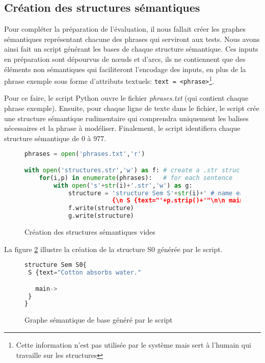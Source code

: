 \subsection{Création des structures sémantiques}\label{sec:pythonstruc}

Pour compléter la préparation de l'évaluation, il nous fallait créer les graphes sémantiques représentant chacune des phrases qui serviront aux tests. Nous avons ainsi fait un script générant les bases de chaque structure sémantique. Ces inputs en préparation sont dépourvus de n\oe{}uds et d'arcs, ils ne contiennent que des éléments non sémantiques qui faciliteront l'encodage des inputs, en plus de la phrase exemple sous forme d'attributs textuels: \texttt{text = <phrase>}\footnote{Cette information n'est pas utilisée par le système mais sert à l'humain qui travaille sur les structures}.

Pour ce faire, le script Python ouvre le fichier \emph{phrases.txt} (qui contient chaque phrase exemple). Ensuite, pour chaque ligne de texte dans le fichier, le script crée une structure sémantique rudimentaire qui comprendra uniquement les balises nécessaires et la phrase à modéliser. Finalement, le script identifiera chaque structure sémantique de 0 à 977.

\begin{figure}[htb]
  \caption{Création des structures sémantiques vides}
	\label{structurepython}
\begin{lstlisting}[language=Python]
phrases = open('phrases.txt','r')

with open('structures.str','w') as f: # create a .str structure
    for(i,p) in enumerate(phrases):   # for each sentence
        with open('s'+str(i)+'.str','w') as g:
            structure = 'structure Sem S'+str(i)+' # name each structure by enumeration
						{\n S {text="'+p.strip()+'"\n\n main-> \n }\n}' #insert as text the sentence
            f.write(structure)
            g.write(structure)
\end{lstlisting}
\end{figure}

La figure \ref{fig:RSem0} illustre la création de la structure S0 générée par le script.

\begin{figure}[htb]
  \caption{Graphe sémantique de base généré par le script}
	\label{fig:RSem0}
\begin{lstlisting}[language=Python]
structure Sem S0{
 S {text="Cotton absorbs water."

   main-> 
 }
}
\end{lstlisting}
\end{figure}

